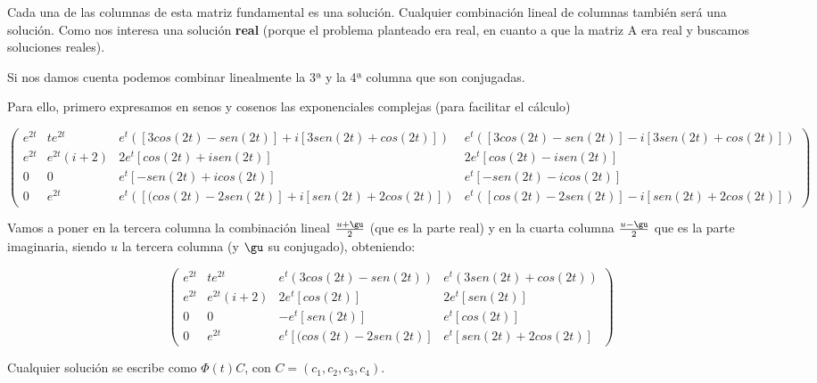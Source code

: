 \documentclass[nochap]{apuntes}
\begin{document}
Cada una de las columnas de esta matriz fundamental es una solución. Cualquier combinación lineal de columnas también será una solución. Como nos interesa una solución \textbf{real} (porque el problema planteado era real, en cuanto a que la matriz A era real y buscamos soluciones reales).

Si nos damos cuenta podemos combinar linealmente la 3ª y la 4ª columna que son conjugadas.

Para ello, primero expresamos en senos y cosenos las exponenciales complejas (para facilitar el cálculo)

\[\begin{pmatrix}
e^{2t} & te^{2t} & e^t\left([3cos(2t)-sen(2t)] + i [3sen(2t) + cos(2t)]\right)& e^t\left([3cos(2t)-sen(2t)] - i [3sen(2t) + cos(2t)]\right) \\
e^{2t} & e^{2t}(i+2)& 2e^t[cos(2t) + isen(2t)] & 2e^t[cos(2t) - isen(2t)]\\
0 & 0 & e^t[-sen(2t) + icos(2t)] & e^t[-sen(2t) - icos(2t)] \\
0 & e^{2t} & e^t\left([(cos(2t) - 2sen(2t)] + i[sen(2t) + 2cos(2t)]\right) & e^t\left([cos(2t) - 2sen(2t)] - i[sen(2t) + 2cos(2t)]\right)
\end{pmatrix}\]

Vamos a poner en la tercera columna la combinación lineal $\frac{u+\gu}{2}$ (que es la parte real) y en la cuarta columna $\frac{u-\gu}{2}$ que es la parte imaginaria, siendo $u$ la tercera columna (y $\gu$ su conjugado), obteniendo:

\[\begin{pmatrix}
e^{2t} & te^{2t} & e^t\left(3cos(2t)-sen(2t)\right)& e^t\left(3sen(2t) + cos(2t)\right) \\
e^{2t} & e^{2t}(i+2)& 2e^t[cos(2t)] & 2e^t[sen(2t)]\\
0 & 0 & -e^t[sen(2t)] & e^t[cos(2t)] \\
0 & e^{2t} & e^t[(cos(2t) - 2sen(2t)] & e^t[sen(2t) + 2cos(2t)]
\end{pmatrix}\]

Cualquier solución se escribe como $\Phi(t)C$, con $C = (c_1,c_2,c_3,c_4)$.

\newpage


\newpage
\printindex
\end{document}
